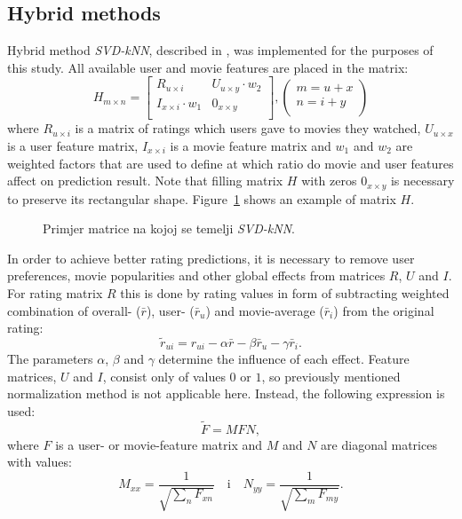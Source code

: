 \documentclass[conference,a4paper]{IEEEtran}
\begin{document}
\subsection{Hybrid methods}

Hybrid method \emph{SVD-kNN}, described in \cite{spiegel2009hydra}, was
implemented for the purposes of this study. All available user and movie
features are placed in the matrix:
\[
H_{m \times n} = 
\left[ {\begin{array}{cc}
 R_{u \times i} & U_{u \times y} \cdot w_{2}  \\
 I_{x \times i} \cdot w_{1} & 0_{x \times y}  \\
\end{array} } \right],
\left( {\begin{array}{cc}
 m = u + x  \\
 n = i + y  \\
\end{array} } \right)
\]
where $R_{u \times i}$ is a matrix of ratings which users gave to movies they 
watched, $U_{u \times x}$ is a user feature matrix, $I_{x \times i}$ is a movie
feature matrix and $w_{1}$ and $w_{2}$ are weighted factors that are used to
define at which ratio do movie and user features affect on prediction result.
Note that filling matrix $H$ with zeros $0_{x \times y}$ is necessary to
preserve its rectangular shape. Figure~\ref{fig:hibridniModel} shows an example
of matrix $H$.

\begin{figure}
\begin{center}
\caption{Primjer matrice na kojoj se temelji \emph{SVD-kNN}.}
\label{fig:hibridniModel}
\end{center}
\end{figure}

In order to achieve better rating predictions, it is necessary to remove user
preferences, movie popularities and other global effects from matrices $R$, $U$
and $I$. For rating matrix $R$ this is done by 
rating
values in form of subtracting weighted combination of overall- ($\bar{r}$),
user- ($\bar{r}_{u}$) and movie-average ($\bar{r}_{i}$) from the original
rating:
\[
\tilde{r}_{ui} = r_{ui} - \alpha\bar{r} - \beta\bar{r}_{u} - \gamma\bar{r}_{i}.
\]
The parameters $\alpha$, $\beta$ and $\gamma$ determine the influence of each
effect. Feature matrices, $U$ and $I$, consist only of values $0$ or $1$, so
previously mentioned normalization method is not applicable here. Instead, the
following expression is used:
\[
\tilde{F} = M F N,
\]
where $F$ is a user- or movie-feature matrix and $M$ and $N$ are diagonal
matrices with values:
\[
M_{xx} = \frac{1}{\sqrt{\sum\limits_{n}F_{xn}}} \quad \mbox{i}\quad N_{yy} =
\frac{1}{\sqrt{\sum\limits_{m}F_{my}}}.
\]
\end{document}
